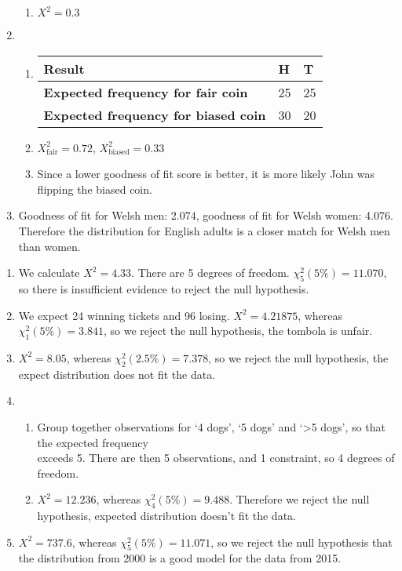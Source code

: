 \documentclass[fleqn]{article}
\begin{document}
\begin{enumerate}
\begin{enumerate}[label=\bfseries \alph*\space ]
            \item $X^2=0.3$
        \end{enumerate}
    \item \begin{enumerate}[label=\bfseries \alph*\space ]
            \item \begin{tabularx}{0.55\textwidth}{|X|*2{P{12mm}|}}
                    \hline
                    \textbf{Result}                             & \textbf{H} & \textbf{T}  \\\hline
                    \textbf{Expected frequency for fair coin}   & 25          & 25         \\\hline
                    \textbf{Expected frequency for biased coin} & 30          & 20         \\\hline
                \end{tabularx}\vspace{6mm}
            \item $X_{\text{fair}}^2=0.72$, $X_{\text{biased}}^2=0.33$
            \item Since a lower goodness of fit score is better, it is more likely John was flipping the biased coin.
        \end{enumerate}
    \item Goodness of fit for Welsh men: 2.074, goodness of fit for Welsh women: 4.076. Therefore the distribution for English adults is a closer match for Welsh men than women.
\end{enumerate}


\begin{enumerate}
    \setlength\itemsep{0.5em}
    \item We calculate $X^2=4.33$. There are 5 degrees of freedom. $\chi_5^2(5\%)=11.070$, so there is insufficient evidence to reject the null hypothesis.
    \item We expect 24 winning tickets and 96 losing. $X^2=4.21875$, whereas $\chi_1^2(5\%)=3.841$, so we reject the null hypothesis, the tombola is unfair.
    \item $X^2=8.05$, whereas $\chi_2^2(2.5\%)=7.378$, so we reject the null hypothesis, the expect distribution does not fit the data.
    \item \begin{enumerate}[label=\bfseries \alph*\space ]
            \item Group together observations for `4 dogs', `5 dogs' and `>5 dogs', so that the expected frequency\\ exceeds 5. There are then 5 observations, and 1 constraint, so 4 degrees of freedom.
            \item $X^2=12.236$, whereas $\chi_4^2(5\%)=9.488$. Therefore we reject the null hypothesis, expected distribution doesn't fit the data. 
        \end{enumerate}
    \item $X^2=737.6$, whereas $\chi_5^2(5\%)=11.071$, so we reject the null hypothesis that the distribution from 2000 is a good model for the data from 2015.
\end{enumerate}
\end{document}
